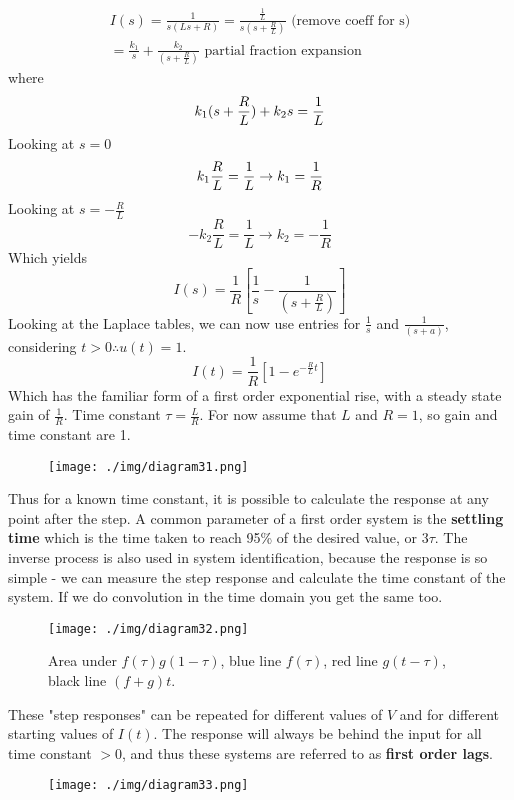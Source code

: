 \begin{gather}
  I(s) = \frac{1}{s(Ls + R)} = \frac{\frac{1}{L}}{s(s+\frac{R}{L})} \textrm{ (remove coeff for s)}\\
  = \frac{k_1}{s} + \frac{k_2}{(s + \frac{R}{L})} \textrm{ partial fraction expansion}
\end{gather}
where
\begin{equation}
  k_1 (s + \frac{R}{L}) + k_2 s = \frac{1}{L}\\
\end{equation}
Looking at $s=0$
\begin{equation}
  k_1 \frac{R}{L} = \frac{1}{L} \rightarrow k_1 = \frac{1}{R}\\
\end{equation}
Looking at $s= -\frac{R}{L}$
\begin{equation}
  -k_2 \frac{R}{L} = \frac{1}{L} \rightarrow k_2 = -\frac{1}{R}
\end{equation}
Which yields
\begin{equation}
  I(s) = \frac{1}{R} \left[ \frac{1}{s} - \frac{1}{(s+\frac{R}{L})} \right]
\end{equation}
Looking at the Laplace tables, we can now use entries for $\frac{1}{s}$ and $\frac{1}{(s + a)}$, considering $t > 0 \therefore u(t) = 1$.
\begin{equation}
  I(t) = \frac{1}{R} \left[ 1 - e^{-\frac{R}{L}t}\right]
\end{equation}
Which has the familiar form of a first order exponential rise, with a steady state gain of $\frac{1}{R}$. Time constant $\tau = \frac{L}{R}$. For now assume that $L$ and $R = 1$, so gain and time constant are 1.
\begin{figure}[H]
  \centering
  \texttt{[image: ./img/diagram31.png]}
\end{figure}
Thus for a known time constant, it is possible to calculate the response at any point after the step. A common parameter of a first order system is the \textbf{settling time} which is the time taken to reach 95\% of the desired value, or $3\tau$. The inverse process is also used in system identification, because the response is so simple - we can measure the step response and calculate the time constant of the system. If we do convolution in the time domain you get the same too.
\begin{figure}[H]
  \centering
  \texttt{[image: ./img/diagram32.png]}
  \caption{Area under $f(\tau)g(1-\tau)$, blue line $f(\tau)$, red line $g(t-\tau)$, black line $(f+g)t$.}
\end{figure}
These "step responses" can be repeated for different values of $V$ and for different starting values of $I(t)$. The response will always be behind the input for all time constant $>0$, and thus these systems are referred to as \textbf{first order lags}.
\begin{figure}[H]
  \centering
  \texttt{[image: ./img/diagram33.png]}
\end{figure}
